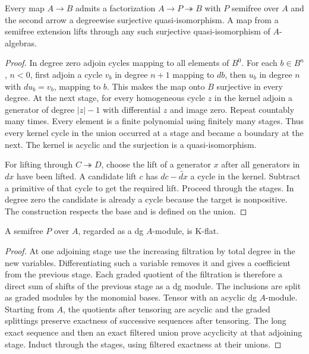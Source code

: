 \begin{theorem}\label{res:A02}
Every map \(A\to B\) admits a factorization
\(A\to P\twoheadrightarrow B\) with \(P\) semifree over \(A\)
and the second arrow a degreewise surjective quasi-isomorphism.
A map from a semifree extension lifts through any such surjective
quasi-isomorphism of \(A\)-algebras.
\end{theorem}
\begin{proof}
In degree zero adjoin cycles mapping to all elements of \(B^0\).
For each \(b\in B^n\), \(n<0\), first adjoin a cycle \(v_b\)
in degree \(n+1\) mapping to \(db\), then \(u_b\) in degree \(n\)
with \(du_b=v_b\), mapping to \(b\). This makes the map onto \(B\)
surjective in every degree. At the next stage, for every homogeneous
cycle \(z\) in the kernel adjoin a generator of degree \(|z|-1\)
with differential \(z\) and image zero. Repeat countably many times.
Every element is a finite polynomial using finitely many stages.
Thus every kernel cycle in the union occurred at a stage and became
a boundary at the next. The kernel is acyclic and the surjection is
a quasi-isomorphism.

For lifting through \(C\twoheadrightarrow D\), choose the lift of a
generator \(x\) after all generators in \(dx\) have been lifted.
A candidate lift \(c\) has \(dc-\widetilde{dx}\) a cycle in the kernel.
Subtract a primitive of that cycle to get the required lift. Proceed
through the stages. In degree zero the candidate is already a cycle
because the target is nonpositive. The construction respects the base
and is defined on the union.
\end{proof}

\begin{lemma}\label{res:A03}
A semifree \(P\) over \(A\), regarded as a dg \(A\)-module,
is K-flat.
\end{lemma}
\begin{proof}
At one adjoining stage use the increasing filtration by total degree
in the new variables. Differentiating such a variable removes it and
gives a coefficient from the previous stage. Each graded quotient of
the filtration is therefore a direct sum of shifts of the previous
stage as a dg module. The inclusions are split as graded modules by
the monomial bases. Tensor with an acyclic dg \(A\)-module. Starting
from \(A\), the quotients after tensoring are acyclic and the graded
splittings preserve exactness of successive sequences after tensoring.
The long exact sequence and then an exact filtered union prove
acyclicity at that adjoining stage. Induct through the stages, using
filtered exactness at their unions.
\end{proof}

